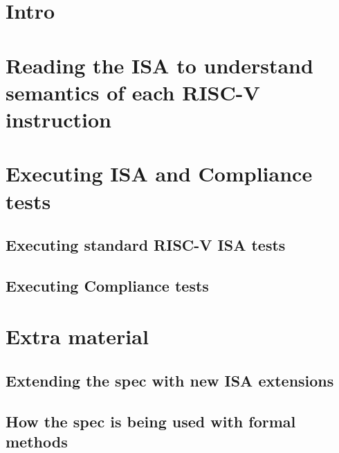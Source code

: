 \documentclass[aspectratio=169]{beamer}
\begin{document}

\section{Intro}


\section{Reading the ISA to understand semantics of each RISC-V instruction}


\section{Executing ISA and Compliance tests}


\subsection{Executing standard RISC-V ISA tests}


\subsection{Executing Compliance tests}


\section{Extra material}


\subsection{Extending the spec with new ISA extensions}


\subsection{How the spec is being used with formal methods}

\end{document}

